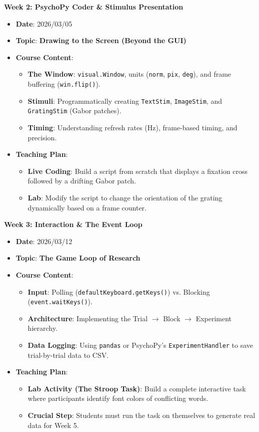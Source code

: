 \noindent\textbf{Week 2: PsychoPy Coder \& Stimulus Presentation}
\begin{itemize}
    \item \textbf{Date}: 2026/03/05
    \item \textbf{Topic}: \textbf{Drawing to the Screen (Beyond the GUI)}
    \item \textbf{Course Content}:
    \begin{itemize}
        \item \textbf{The Window}: \texttt{visual.Window}, units (\texttt{norm}, \texttt{pix}, \texttt{deg}), and frame buffering (\texttt{win.flip()}).
        \item \textbf{Stimuli}: Programmatically creating \texttt{TextStim}, \texttt{ImageStim}, and \texttt{GratingStim} (Gabor patches).
        \item \textbf{Timing}: Understanding refresh rates (Hz), frame-based timing, and precision.
    \end{itemize}
    \item \textbf{Teaching Plan}:
    \begin{itemize}
        \item \textbf{Live Coding}: Build a script from scratch that displays a fixation cross followed by a drifting Gabor patch.
        \item \textbf{Lab}: Modify the script to change the orientation of the grating dynamically based on a frame counter.
    \end{itemize}
\end{itemize}

\noindent\textbf{Week 3: Interaction \& The Event Loop}
\begin{itemize}
    \item \textbf{Date}: 2026/03/12
    \item \textbf{Topic}: \textbf{The Game Loop of Research}
    \item \textbf{Course Content}:
    \begin{itemize}
        \item \textbf{Input}: Polling (\texttt{defaultKeyboard.getKeys()}) vs. Blocking (\texttt{event.waitKeys()}).
        \item \textbf{Architecture}: Implementing the Trial $\rightarrow$ Block $\rightarrow$ Experiment hierarchy.
        \item \textbf{Data Logging}: Using \texttt{pandas} or PsychoPy’s \texttt{ExperimentHandler} to save trial-by-trial data to CSV.
    \end{itemize}
    \item \textbf{Teaching Plan}:
    \begin{itemize}
        \item \textbf{Lab Activity (The Stroop Task)}: Build a complete interactive task where participants identify font colors of conflicting words.
        \item \textbf{Crucial Step}: Students must run the task on themselves to generate real data for Week 5.
    \end{itemize}
\end{itemize}

